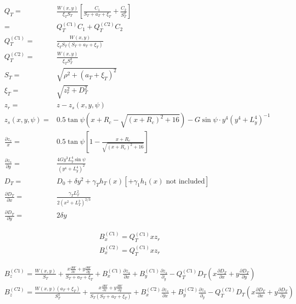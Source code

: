 \documentclass[]{article}
\begin{document}
		\begin{align}
			Q_T =& \frac{W(x,y)}{\xi_T S_T}\left[\frac{C_1}{S_T + a_T + \xi_T} + \frac{C_2}{S_T^2} \right] \\
			=& Q_T^{(C1)} C_1 + Q_T^{(C2)} C_2 \\
			Q_T^{(C1)} =& \frac{W(x,y)}{\xi_T S_T(S_T + a_T + \xi_T)} \\
			Q_T^{(C2)} =& \frac{W(x,y)}{\xi_T S_T^3} \\
			S_T =& \sqrt{\rho^2 + (a_T + \xi_T)^2} \\
			\xi_T =& \sqrt{z_r^2 + D_T^2} \\
			z_r =& z - z_s(x,y,\psi) \\
			z_s(x,y,\psi) =& 0.5\tan{\psi}(x + R_c - \sqrt{(x + R_c)^2 + 16}) - G\sin{\psi}\cdot y^4(y^4 + L_y^4)^{-1} \\
			\frac{\partial z_s}{x} =& 0.5\tan{\psi}\left[1 - \frac{x + R_c}{\sqrt{(x + R_c)^2 + 16}}\right] \\
			\frac{\partial z_s}{\partial y} =& \frac{4 G y^3L_y^4\sin{\psi}}{(y^4 + L_y^4)^2} \\
			D_T =& D_0 + \delta y^2+ \gamma_T h_T(x) [ + \gamma_1 h_1(x) \text{ not included}] \\
			\frac{\partial D_T}{\partial x} =& \frac{\gamma_T L_T^2}{2(x^2 + L_T^2)^{2/3}} \\
			\frac{\partial D_T}{\partial y} =& 2 \delta y
		\end{align}
	
		\begin{align}
			B_x^{(C1)} = Q_T^{(C1)} x z_r \\
			B_x^{(C2)} = Q_T^{(C1)} x z_r 
		\end{align}
	
		\begin{align}
			B_z^{(C1)} = \frac{W(x,y)}{S_T} + \frac{x\frac{\partial W}{\partial x} + y\frac{\partial W}{\partial y}}{S_T + a_T + \xi_T} + B_x^{(C1)}\frac{\partial z_s}{\partial x} + B_y^{(C1)} \frac{\partial z_s}{\partial _y} - Q_T^{(C1)} D_T\left( x\frac{\partial D_T}{\partial x} + y\frac{\partial D_T}{\partial y}\right) \\
			B_z^{(C2)} = \frac{W(x,y)(a_T + \xi_T)}{S_T^3} + \frac{x\frac{\partial W}{\partial x} + y\frac{\partial W}{\partial y}}{S_T(S_T + a_T + \xi_T)} + B_x^{(C2)}\frac{\partial z_s}{\partial x} + B_y^{(C2)} \frac{\partial z_s}{\partial _y} - Q_T^{(C2)} D_T\left( x\frac{\partial D_T}{\partial x} + y\frac{\partial D_T}{\partial y}\right)
		\end{align}
	






\end{document}
